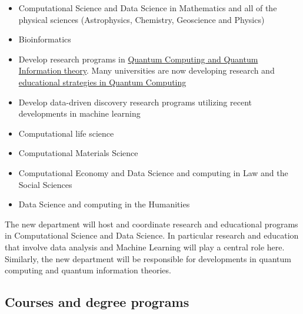 \documentclass[oneside,final,10pt]{article}
\begin{document}
\begin{itemize}
\item Computational Science and Data Science in Mathematics and all of the physical sciences (Astrophysics, Chemistry, Geoscience and Physics)

\item Bioinformatics

\item Develop research programs in \href{{https://www.aps.org/publications/apsnews/201802/ostp.cfm?utm_source=APS+Physics+Main+Group&utm_campaign=fb7a2e7d6b-News+021218&utm_medium=email&utm_term=0_825303224b-fb7a2e7d6b-106513221}}{Quantum Computing and Quantum Information theory}. Many universities are now developing research and \href{{https://vprgs.msu.edu/event/interdisciplinary-forum-quantum-information-science}}{educational strategies in Quantum Computing}

\item Develop data-driven discovery research programs utilizing recent developments in machine learning

\item Computational life science

\item Computational Materials Science

\item Computational Economy and Data Science and computing in Law and the Social Sciences

\item Data Science and computing in the Humanities
\end{itemize}

\noindent
The new department will host and coordinate research and educational programs in Computational Science and Data Science. In particular research and education that involve  data analysis and Machine Learning will play a central role here. Similarly, the new department will be responsible for developments in quantum computing and quantum information theories. 

\subsection*{Courses and degree programs}
\end{document}
